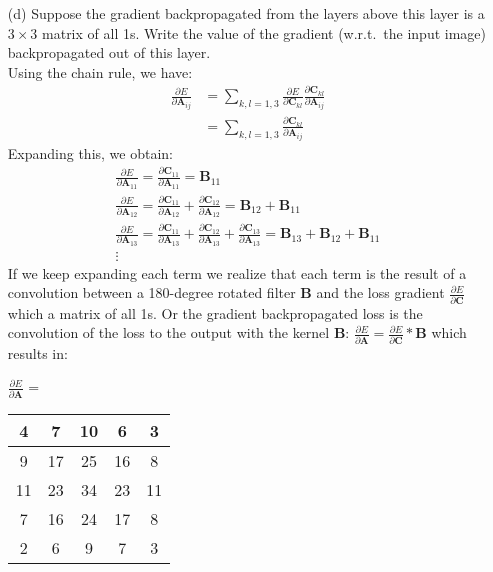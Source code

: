 \documentclass[11pt]{article}
\newcommand{\0}{\mat{0}}
\newcommand{\matr}[1]{\bm{#1}}     %
\begin{document}
\begin{itemize}
    \item[(d)] Suppose the gradient backpropagated from the layers above this layer is a $3\times 3$ matrix of all 1s. Write the value of the gradient (w.r.t.~the input image) backpropagated out of this layer.\\
    
    \smallskip
    Using the chain rule, we have:
   \begin{align*}
    	\frac{\partial E}{ \partial  \matr{A}_{ij}} &= \sum_{k,l=1,3} \frac{\partial E}{\partial \matr{C}_{kl}}   \frac{\partial \matr{C}_{kl}} {\partial  \matr{A}_{ij}} \\
	&= \sum_{k,l=1,3}  \frac{\partial \matr{C}_{kl}} {\partial  \matr{A}_{ij}}
    \end{align*}
    Expanding this, we obtain:
   \begin{gather*}
   	\frac{\partial E}{ \partial  \matr{A}_{11}} = \frac{\partial \matr{C}_{11}} {\partial  \matr{A}_{11}} =   \matr{B}_{11} \\
   	\frac{\partial E}{ \partial  \matr{A}_{12}} = \frac{\partial \matr{C}_{11}} {\partial  \matr{A}_{12}} + \frac{\partial \matr{C}_{12}} {\partial  \matr{A}_{12}} =    \matr{B}_{12} + \matr{B}_{11} \\
	\frac{\partial E}{ \partial  \matr{A}_{13}} = \frac{\partial \matr{C}_{11}} {\partial  \matr{A}_{13}} + \frac{\partial \matr{C}_{12}} {\partial  \matr{A}_{13}} + \frac{\partial \matr{C}_{13}} {\partial  \matr{A}_{13}}  =   \matr{B}_{13} + \matr{B}_{12} + \matr{B}_{11} \\
	\vdots
    \end{gather*}
    If we keep expanding each term we realize that each term is the result of a convolution between a 180-degree rotated filter $\matr{B}$ and the loss gradient $\frac{\partial E}{\partial \matr{C}}$ which a matrix of all 1s.
    Or the gradient backpropagated  loss is the convolution of the loss to the output with the kernel $\matr{B}$:
    $\frac{\partial E}{\partial \matr{A}} = \frac{\partial E}{\partial \matr{C}} * {\matr{B}}$ which results in:
    
    	    \begin{table}[!ht]
		    \centering
    		 $\frac{\partial E}{\partial \matr{A}}$ = \begin{tabular}{|c|c|c|c|c|}  
    			\hline
    			4  & 7    & 10 & 6   & 3 \\ \hline 
		        9   & 17 & 25 & 16 & 8 \\ \hline
		        11 & 23 & 34 & 23 & 11 \\ \hline 
		        7   & 16 & 24 & 17 & 8 \\ \hline
		        2   & 6   & 9   & 7   & 3 \\ \hline
    		\end{tabular}\hspace{1cm}
        	 \end{table}

\end{itemize}
\end{document}
